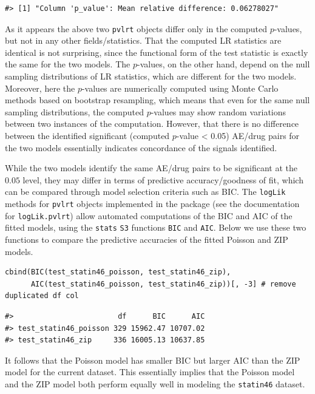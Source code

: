 \begin{verbatim}
#> [1] "Column 'p_value': Mean relative difference: 0.06278027"
\end{verbatim}

As it appears the above two \texttt{pvlrt} objects differ only in the computed \(p\)-values, but not in any other fields/statistics. That the computed LR statistics are identical is not surprising, since the functional form of the test statistic is exactly the same for the two models. The \(p\)-values, on the other hand, depend on the null sampling distributions of LR statistics, which are different for the two models. Moreover, here the \(p\)-values are numerically computed using Monte Carlo methods based on bootstrap resampling, which means that even for the same null sampling distributions, the computed \(p\)-values may show random variations between two instances of the computation. However, that there is no difference between the identified significant (computed \(p\)-value \textless{} 0.05) AE/drug pairs for the two models essentially indicates concordance of the signals identified.

While the two models identify the same AE/drug pairs to be significant at the \(0.05\) level, they may differ in terms of predictive accuracy/goodness of fit, which can be compared through model selection criteria such as BIC. The \texttt{logLik} methods for \texttt{pvlrt} objects implemented in the package (see the documentation for \texttt{logLik.pvlrt}) allow automated computations of the BIC and AIC of the fitted models, using the \texttt{stats} \texttt{S3} functions \texttt{BIC} and \texttt{AIC}. Below we use these two functions to compare the predictive accuracies of the fitted Poisson and ZIP models.

\begin{verbatim}
cbind(BIC(test_statin46_poisson, test_statin46_zip), 
      AIC(test_statin46_poisson, test_statin46_zip))[, -3] # remove duplicated df col
\end{verbatim}

\begin{verbatim}
#>                        df      BIC      AIC
#> test_statin46_poisson 329 15962.47 10707.02
#> test_statin46_zip     336 16005.13 10637.85
\end{verbatim}

It follows that the Poisson model has smaller BIC but larger AIC than the ZIP model for the current dataset. This essentially implies that the Poisson model and the ZIP model both perform equally well in modeling the \texttt{statin46} dataset.


